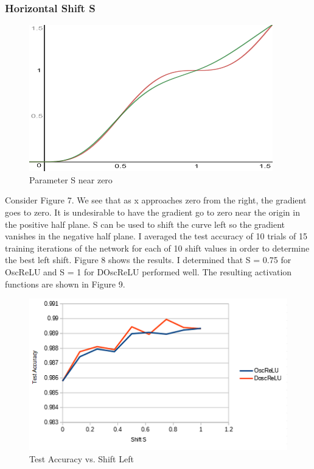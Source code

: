 \documentclass{amsart}
\theoremstyle{definition}
\theoremstyle{remark}
\numberwithin{equation}{section}
\newcommand{\blankbox}[2]{%
  \parbox{\columnwidth}{\centering
    \setlength{\fboxsep}{0pt}%
    \fbox{\raisebox{0pt}[#2]{\hspace{#1}}}%
  }%
}
\begin{document}
\subsubsection{Horizontal Shift S} \hfill\break  

\begin{figure}[!h]
\includegraphics[1]{Shift.png}
\caption{Parameter S near zero}
\label{Figure 7}
\end{figure} 

Consider Figure 7. We see that as x approaches zero from the right, the gradient goes to zero.  It is undesirable to have the gradient go to zero near the origin in the positive half plane. S can be used to shift the curve left so the gradient vanishes in the negative half plane.  I averaged the test accuracy of 10 trials of 15 training iterations of the network for each of 10 shift values in order to determine the best left shift.  Figure 8 shows the results.  I determined that 
S = 0.75 for OscReLU and S = 1 for DOscReLU performed well.  The resulting activation functions are shown in Figure 9.

\begin{figure}[!h]
\includegraphics[1]{ShiftTest.png}
\caption{Test Accuracy vs. Shift Left}
\label{Figure 8}
\end{figure} 
\end{document}
